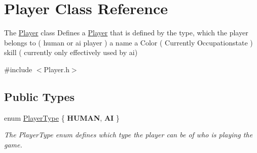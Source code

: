 \hypertarget{classPlayer}{\section{Player Class Reference}
\label{classPlayer}
}


The \hyperlink{classPlayer}{Player} class Defines a \hyperlink{classPlayer}{Player} that is defined by the type, which the player belongs to ( human or ai player ) a name a Color ( Currently Occupationstate ) skill ( currently only effectively used by ai)  




{\ttfamily \#include $<$Player.\-h$>$}

\subsection*{Public Types}
\begin{DoxyCompactItemize}
\item 
enum \hyperlink{classPlayer_a97dc3c423902370176605121e8f68415}{Player\-Type} \{ {\bfseries H\-U\-M\-A\-N}, 
{\bfseries A\-I}
 \}
\begin{DoxyCompactList}\small\item\em The Player\-Type enum defines which type the player can be of who is playing the game. \end{DoxyCompactList}\end{DoxyCompactItemize}
